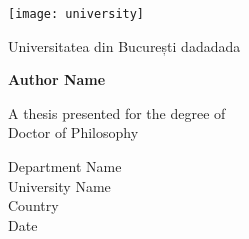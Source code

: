 \begin{titlepage}
	\begin{center}

		\texttt{[image: university]}

		\vspace{0.5cm}
		Universitatea din București dadadada

		\vspace{1.5cm}

		\textbf{Author Name}

		\vfill

		A thesis presented for the degree of\\
		Doctor of Philosophy

		\vspace{0.8cm}


		Department Name\\
		University Name\\
		Country\\
		Date

	\end{center}
\end{titlepage}
 
